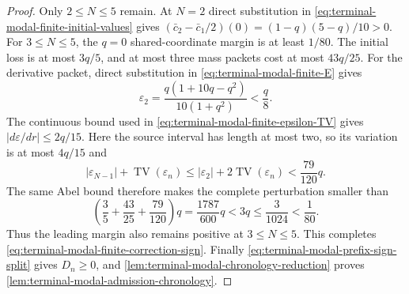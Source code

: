 \begin{proof}
Only $2\le N\le5$ remain.  At $N=2$ direct substitution in
\eqref{eq:terminal-modal-finite-initial-values} gives
$(\bar c_2-\bar c_1/2)(0)=(1-q)(5-q)/10>0$.  For $3\le N\le5$, the $q=0$
shared-coordinate margin is at least $1/80$.  The initial loss is at most
$3q/5$, and at most three mass packets cost at most $43q/25$.
For the derivative packet, direct substitution in
\eqref{eq:terminal-modal-finite-E} gives
\begin{equation}
 \varepsilon_2=\frac{q(1+10q-q^2)}{10(1+q^2)}<\frac q8.
\end{equation}
The continuous bound used in \eqref{eq:terminal-modal-finite-epsilon-TV}
gives $|d\varepsilon/dr|\le2q/15$.  Here the source interval has length at most
two, so its variation is at most $4q/15$ and
\[
 |\varepsilon_{N-1}|+\operatorname{TV}(\varepsilon_n)
 \le |\varepsilon_2|+2\operatorname{TV}(\varepsilon_n)
 <\frac{79}{120}q.
\]
The same Abel bound therefore makes the complete perturbation smaller than
\[
 \left(\frac35+\frac{43}{25}+\frac{79}{120}\right)q
 =\frac{1787}{600}q<3q\le\frac3{1024}<\frac1{80}.
\]
Thus the leading margin also remains positive at $3\le N\le5$.
This completes \eqref{eq:terminal-modal-finite-correction-sign}.  Finally
\eqref{eq:terminal-modal-prefix-sign-split} gives $D_n\ge0$, and
\cref{lem:terminal-modal-chronology-reduction} proves
\cref{lem:terminal-modal-admission-chronology}.
\end{proof}
